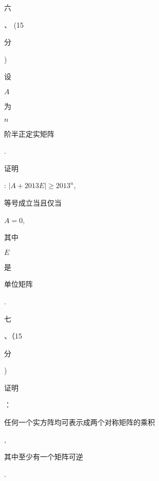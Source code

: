 \documentclass[10pt]{article}
\begin{document}
\begin{CJK}{UTF8}{mj}六\end{CJK}、 (15 \begin{CJK}{UTF8}{mj}分\end{CJK}) \begin{CJK}{UTF8}{mj}设\end{CJK} $A$ \begin{CJK}{UTF8}{mj}为\end{CJK} $n$ \begin{CJK}{UTF8}{mj}阶半正定实矩阵\end{CJK}. \begin{CJK}{UTF8}{mj}证明\end{CJK}: $|A+2013 E| \geq 2013^{n}$, \begin{CJK}{UTF8}{mj}等号成立当且仅当\end{CJK} $A=0$, \begin{CJK}{UTF8}{mj}其中\end{CJK} $E$ \begin{CJK}{UTF8}{mj}是\end{CJK} \begin{CJK}{UTF8}{mj}单位矩阵\end{CJK}.

\begin{CJK}{UTF8}{mj}七\end{CJK}、（15 \begin{CJK}{UTF8}{mj}分\end{CJK}) \begin{CJK}{UTF8}{mj}证明\end{CJK}：\begin{CJK}{UTF8}{mj}任何一个实方阵均可表示成两个对称矩阵的乘积\end{CJK}, \begin{CJK}{UTF8}{mj}其中至少有一个矩阵可逆\end{CJK}.
\end{document}
